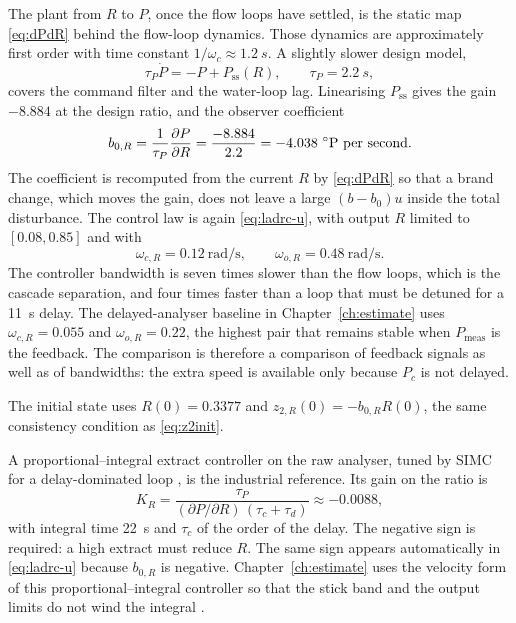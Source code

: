 The plant from $R$ to $P$, once the flow loops have settled, is the static map \eqref{eq:dPdR} behind the flow-loop dynamics. Those dynamics are approximately first order with time constant $1/\omega_c \approx \SI{1.2}{s}$. A slightly slower design model,
\begin{equation}
\label{eq:extract-model}
\tau_P \dot{P} = -P + P_{\mathrm{ss}}(R), \qquad \tau_P = \SI{2.2}{s},
\end{equation}
covers the command filter and the water-loop lag. Linearising $P_{\mathrm{ss}}$ gives the gain $-8.884$ at the design ratio, and the observer coefficient
\begin{equation}
\label{eq:b0r}
b_{0,R} = \frac{1}{\tau_P}\frac{\partial P}{\partial R} = \frac{-8.884}{2.2} = -4.038\ ^{\circ}\mathrm{P}\ \text{per second}.
\end{equation}
The coefficient is recomputed from the current $R$ by \eqref{eq:dPdR} so that a brand change, which moves the gain, does not leave a large $(b-b_0)u$ inside the total disturbance. The control law is again \eqref{eq:ladrc-u}, with output $R$ limited to $[0.08,0.85]$ and with
\begin{equation}
\label{eq:r-bw}
\omega_{c,R} = 0.12\ \si{\radian\per\second}, \qquad \omega_{o,R} = 0.48\ \si{\radian\per\second}.
\end{equation}
The controller bandwidth is seven times slower than the flow loops, which is the cascade separation, and four times faster than a loop that must be detuned for a \SI{11}{s} delay. The delayed-analyser baseline in Chapter~\ref{ch:estimate} uses $\omega_{c,R}=0.055$ and $\omega_{o,R}=0.22$, the highest pair that remains stable when $P_{\mathrm{meas}}$ is the feedback. The comparison is therefore a comparison of feedback signals as well as of bandwidths: the extra speed is available only because $P_c$ is not delayed.

The initial state uses $R(0)=0.3377$ and $z_{2,R}(0) = -b_{0,R} R(0)$, the same consistency condition as \eqref{eq:z2init}.

A proportional--integral extract controller on the raw analyser, tuned by SIMC for a delay-dominated loop \cite{skogestad2003simc}, is the industrial reference. Its gain on the ratio is
\begin{equation}
K_R = \frac{\tau_P}{(\partial P/\partial R)\,(\tau_c+\tau_d)} \approx -0.0088,
\end{equation}
with integral time \SI{22}{s} and $\tau_c$ of the order of the delay. The negative sign is required: a high extract must reduce $R$. The same sign appears automatically in \eqref{eq:ladrc-u} because $b_{0,R}$ is negative. Chapter~\ref{ch:estimate} uses the velocity form of this proportional--integral controller so that the stick band and the output limits do not wind the integral \cite{astrom2006advanced}.


